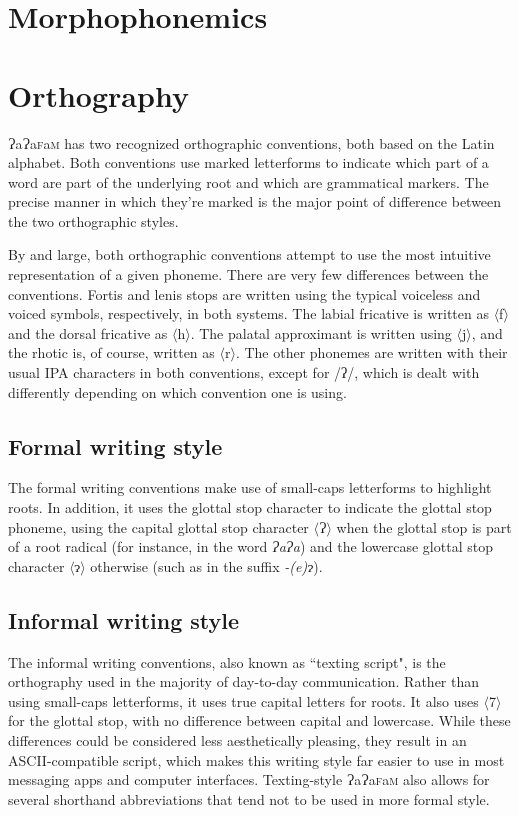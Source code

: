 \documentclass[a4paper,10pt,twoside,openright]{memoir}
\newcommand{\lang}{ɁaɁa\textsc{f}a\textsc{m}}
\newcommand{\sqbrack}[1]{$\langle$#1$\rangle$}
\newcommand{\phipa}[1]{/#1/}
\newcommand{\glotstop}{ʔ}
\newcommand{\bigglot}{Ɂ}
\newcommand{\lilglot}{ɂ}
\begin{document}
\section{Morphophonemics}

\section{Orthography}

\lang{} has two recognized orthographic conventions, both based on the Latin alphabet. Both conventions use marked letterforms to indicate which part of a word are part of the underlying root and which are grammatical markers. The precise manner in which they're marked is the major point of difference between the two orthographic styles.

By and large, both orthographic conventions attempt to use the most intuitive representation of a given phoneme. There are very few differences between the conventions. Fortis and lenis stops are written using the typical voiceless and voiced symbols, respectively, in both systems. The labial fricative is written as \sqbrack{f} and the dorsal fricative as \sqbrack{h}. The palatal approximant is written using \sqbrack{j}, and the rhotic is, of course, written as \sqbrack{r}. The other phonemes are written with their usual IPA characters in both conventions, except for \phipa{\glotstop}, which is dealt with differently depending on which convention one is using.

\subsection{Formal writing style}

The formal writing conventions make use of small-caps letterforms to highlight roots. In addition, it uses the glottal stop character to indicate the glottal stop phoneme, using the capital glottal stop character \sqbrack{\bigglot} when the glottal stop is part of a root radical (for instance, in the word \textit{\bigglot a\bigglot a}) and the lowercase glottal stop character \sqbrack{\lilglot} otherwise (such as in the suffix \textit{-(e)\lilglot}).

\subsection{Informal writing style}

The informal writing conventions, also known as ``texting script", is the orthography used in the majority of day-to-day communication. Rather than using small-caps letterforms, it uses true capital letters for roots. It also uses \sqbrack{7} for the glottal stop, with no difference between capital and lowercase. While these differences could be considered less aesthetically pleasing, they result in an ASCII-compatible script, which makes this writing style far easier to use in most messaging apps and computer interfaces. Texting-style \lang{} also allows for several shorthand abbreviations that tend not to be used in more formal style.
\end{document}
